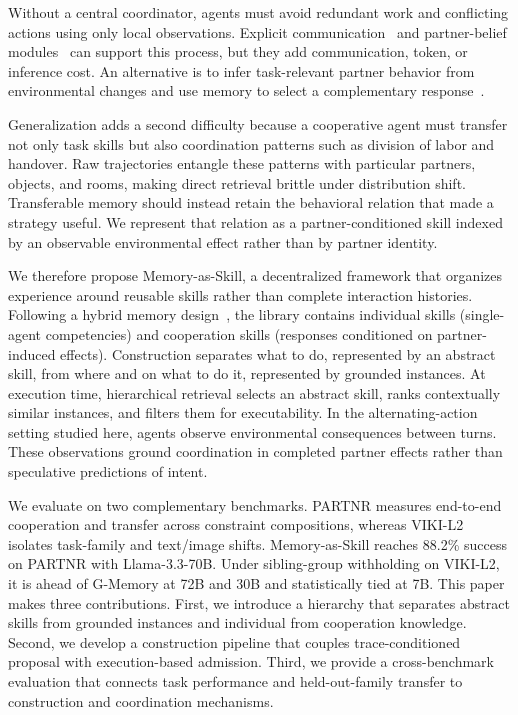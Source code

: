 \documentclass{article}
\theoremstyle{plain}
\theoremstyle{definition}
\theoremstyle{remark}
\begin{document}
Without a central coordinator, agents must avoid redundant work and conflicting actions using only local observations. Explicit communication~\citep{zhang2023building} and partner-belief modules~\citep{zhang2024proagent,li2023theory} can support this process, but they add communication, token, or inference cost. An alternative is to infer task-relevant partner behavior from environmental changes and use memory to select a complementary response~\citep{omidshafiei2017deep}.
 
Generalization adds a second difficulty because a cooperative agent must transfer not only task skills but also coordination patterns such as division of labor and handover. Raw trajectories entangle these patterns with particular partners, objects, and rooms, making direct retrieval brittle under distribution shift. Transferable memory should instead retain the behavioral relation that made a strategy useful. We represent that relation as a partner-conditioned skill indexed by an observable environmental effect rather than by partner identity.
 
 
We therefore propose Memory-as-Skill, a decentralized framework that organizes experience around reusable skills rather than complete interaction histories. Following a hybrid memory design~\citep{hu2025memory}, the library contains individual skills (single-agent competencies) and cooperation skills (responses conditioned on partner-induced effects). Construction separates what to do, represented by an abstract skill, from where and on what to do it, represented by grounded instances. At execution time, hierarchical retrieval selects an abstract skill, ranks contextually similar instances, and filters them for executability. In the alternating-action setting studied here, agents observe environmental consequences between turns. These observations ground coordination in completed partner effects rather than speculative predictions of intent.
 
We evaluate on two complementary benchmarks. PARTNR measures end-to-end cooperation and transfer across constraint compositions, whereas VIKI-L2 isolates task-family and text/image shifts. Memory-as-Skill reaches 88.2\% success on PARTNR with Llama-3.3-70B. Under sibling-group withholding on VIKI-L2, it is ahead of G-Memory at 72B and 30B and statistically tied at 7B. This paper makes three contributions. First, we introduce a hierarchy that separates abstract skills from grounded instances and individual from cooperation knowledge. Second, we develop a construction pipeline that couples trace-conditioned proposal with execution-based admission. Third, we provide a cross-benchmark evaluation that connects task performance and held-out-family transfer to construction and coordination mechanisms.
 
\end{document}
